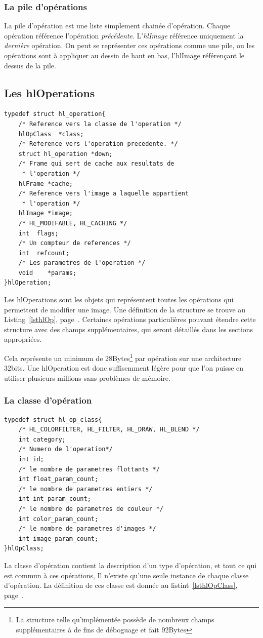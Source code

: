 		\subsubsection{La pile d'opérations}
			La pile d'opération est une liste simplement chainée d'opération. Chaque opération référence l'opération \emph{précédente}.
			L'\emph{hlImage} référence uniquement la \emph{dernière} opération. On peut se représenter ces opérations comme une pile,
			ou les opérations sont à appliquer au dessin de haut en bas, l'hlImage référençant le dessus de la pile. 
		\subsection{Les hlOperations}
		\begin{lstlisting}[float,caption={Définition des hlOperations },frame=tb,label=lsthlOp]
typedef struct hl_operation{
	/* Reference vers la classe de l'operation */
	hlOpClass  *class;	
	/* Reference vers l'operation precedente. */
	struct hl_operation *down;
	/* Frame qui sert de cache aux resultats de 
	 * l'operation */
	hlFrame *cache;			
	/* Reference vers l'image a laquelle appartient 
	 * l'operation */
	hlImage *image;			
	/* HL_MODIFABLE, HL_CACHING */
	int	 flags;			
	/* Un compteur de references */
	int	 refcount;		
	/* Les parametres de l'operation */
	void	*params;		
}hlOperation;
		\end{lstlisting}
		Les hlOperations sont les objets qui représentent toutes les opérations qui permettent de modifier une image. Une définition de la structure
		se trouve au Listing~\ref{lsthlOp}, page~\pageref{lsthlOp}. Certaines opérations particulières pouvant étendre cette structure avec des
		champs supplémentaires, qui seront détaillés dans les sections appropriées.

		Cela représente un minimum de 28Bytes\footnote{La structure telle qu'implémentée possède de nombreux champs supplémentaires à de fins de déboguage et fait
		92Bytes} par opération sur une architecture 32bits. Une hlOperation est donc suffisemment légère pour
		que l'on puisse en utiliser plusieurs millions sans problèmes de mémoire. 

		\subsubsection{La classe d'opération}
			\begin{lstlisting}[float,caption={Définition des classes d'opérations },frame=tb,label=lsthlOpClass]
typedef struct hl_op_class{
	/* HL_COLORFILTER, HL_FILTER, HL_DRAW, HL_BLEND */
	int category;
	/* Numero de l'operation*/
	int id;
	/* le nombre de parametres flottants */
	int float_param_count;
	/* le nombre de parametres entiers */
	int int_param_count;
	/* le nombre de parametres de couleur */
	int color_param_count;
	/* le nombre de parametres d'images */
	int image_param_count;
}hlOpClass;
			\end{lstlisting}
			La classe d'opération contient la description d'un type d'opération, et tout ce qui est commun à ces opérations, Il n'existe qu'une
			seule instance de chaque classe d'opération. La définition de ces classe est donnée au listint~\ref{lsthlOpClass}, page~\pageref{lsthlOpClass}.

